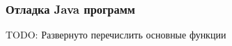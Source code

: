 \begin{frame}
\frametitle{Отладка Java программ} %
TODO: Развернуто перечислить основные функции
\end{frame}